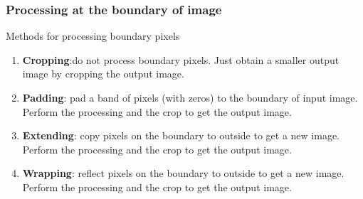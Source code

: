 \documentclass[english,11pt,table,handout]{beamer}
\begin{document}
{
	\frametitle{Processing at the boundary of image}
	
	\begin{block}{Methods for processing boundary pixels}
		\begin{enumerate}
			\item \textbf{Cropping}:do not process boundary pixels. Just obtain a smaller output image by cropping the output image.
			\item \textbf{Padding}: pad a band of pixels (with zeros) to the boundary of input image. Perform the processing and the crop to get the output image.
			\item \textbf{Extending}: copy pixels on the boundary to outside to get a new image. Perform the processing and the crop to get the output image.
			\item \textbf{Wrapping}: reflect pixels on the boundary to outside to get a new image. Perform the processing and the crop to get the output image.
			
		\end{enumerate} 
	\end{block}
	
}
\end{document}
